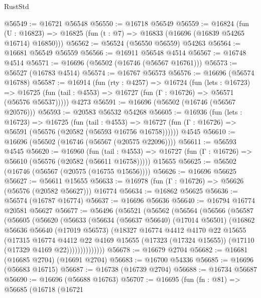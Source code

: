 \begin{lexlean}{RustStd}
\begin{coremodule}
@56549 := @16721 @56548
@56550 := @16718 @56549
@56559 := @16824
    (fun (U : @16823) => @16825 (fun (t : @7) => @16833 (@16696 (@16839 @54265 @16714) @16850)))
@56562 := @56524 (@56550 @56559) @54263
@56564 := @16681 @56549 @56559
@56566 := @16911 @56548 @4514
@56567 := @16748 @4514
@56571 := @16696 (@56502 (@16746 (@56567 @16761)))
@56573 := @56527 (@16783 @4514)
@56574 := @16767 @56573
@56576 := @16696 (@56574 @16788)
@56587 := @16914
    (fun (rty : @4257) =>
    @16724
      (fun (lets : @16723) =>
      @16725 (fun (tail : @4553) => @16727 (fun (Γ : @16726) => @56571 (@56576 @56537)))))
    @4273
@56591 := @16696 (@56502 (@16746 (@56567 @20576)))
@56593 := @20583 @56532 @54268
@56605 := @16936
    (fun (lets : @16723) =>
    @16725
      (fun (tail : @4553) =>
      @16727 (fun (Γ : @16726) => @56591 (@56576 (@20582 (@56593 @16756 @16758))))))
    @4545
@56610 := @16696 (@56502 (@16746 (@56567 (@20575 @22096))))
@56611 := @56593 @4545
@56620 := @16960
    (fun (tail : @4553) => @16727 (fun (Γ : @16726) => @56610 (@56576 (@20582 (@56611 @16758)))))
    @15655
@56625 := @56502 (@16746 (@56567 (@20575 (@16755 @15656))))
@56626 := @16696 @56625
@56627 := @56611 @15655
@56633 := @16978 (fun (Γ : @16726) => @56626 (@56576 (@20582 @56627))) @16774
@56634 := @16862 @56625
@56636 := @56574 (@16787 @16774)
@56637 := @16696 @56636
@56640 := @16794 @16774 @20581 @56627
@56677 := @56496
    (@56521
      (@56562
        (@56564
          (@56566
            (@56587
              (@56605
                (@56620
                  (@56633
                    (@56634
                      (@56637 @56640)
                      (@17014 @56501)
                      (@16862
                        @56636
                        @56640
                        (@17019 @56573)
                        (@18327
                          @16774
                          @4412
                          @4170
                          @22
                          @15655
                          (@17315
                            @16774
                            @4412
                            @22
                            @4169
                            @15655
                            (@17323 (@17324 @15655))
                            (@17110 (@17329 @4169 @22))))))))))))))
@56678 := @16679 @2704
@56682 := @16681 (@16685 @2704) (@16691 @2704)
@56683 := @16700 @54336
@56685 := @16696 (@56683 @16715)
@56687 := @16738 (@16739 @2704)
@56688 := @16734 @56687
@56690 := @16696 (@56688 @16763)
@56707 := @16695
    (fun (fn : @81) =>
    @56685
      (@16718
        (@16721

\end{coremodule}
\end{lexlean}
